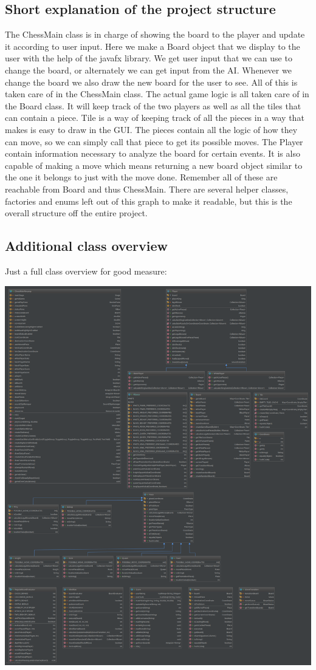 \documentclass{article}
\begin{document}
    \subsection{Short explanation of the project structure}
    The ChessMain class is in charge of showing the board to the player and update it according to user input.
	Here we make a Board object that we display to the user with the help of the javafx library.
	We get user input that we can use to change the board, or alternately we can get input from the AI.
	Whenever we change the board we also draw the new board for the user to see.
	All of this is taken care of in the ChessMain class.
	The actual game logic is all taken care of in the Board class.
	It will keep track of the two players as well as all the tiles that can contain a piece.
	Tile is a way of keeping track of all the pieces in a way that makes is easy to draw in the GUI.
	The pieces contain all the logic of how they can move,
	so we can simply call that piece to get its possible moves.
	The Player contain information necessary to analyze the board for certain events.
	It is also capable of making a move
	which means returning a new board object similar to the one it belongs to just with the move done.
	Remember all of these are reachable from Board and thus ChessMain.
    There are several helper classes, factories and enums left out of this graph to make it readable, but this is the overall structure off the entire project.

    \vspace{30cm}
    \subsection{Additional class overview}
    Just a full class overview for good measure:
    \begin{center}
    \includegraphics[scale=0.19]{extra-class-overview.png}
    \end{center}
\end{document}
